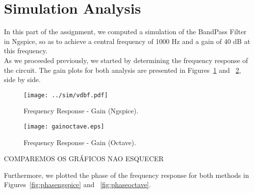 \section{Simulation Analysis}
\label{sec:simulation}

In this part of the assignment, we computed a simulation of the BandPass Filter in Ngspice, so as to achieve a central frequency of 1000 Hz and a gain of 40 dB at this frequency.\\

As we proceeded previously, we started by determining the frequency response of the circuit. The gain plots for both analysis are presented in Figures~\ref{fig:gainngspice} and ~\ref{fig:gainoctave}, side by side.

\vspace{-25mm}

\noindent
\begin{minipage}[c]{0.5\linewidth}

\begin{figure}[H] \centering
\texttt{[image: ../sim/vdbf.pdf]}
\caption{Frequency Response - Gain (Ngspice).}
\label{fig:gainngspice}
\end{figure}

\end{minipage}
\begin{minipage}[c]{0.5\linewidth}

\vspace{16mm}

\begin{figure}[H] \centering
\texttt{[image: gainoctave.eps]}
\caption{Frequency Response - Gain (Octave).}
\label{fig:gainoctave}
\end{figure}

\end{minipage}

COMPAREMOS OS GRÁFICOS NAO ESQUECER

\vspace{10mm}

Furthermore, we plotted the phase of the frequency response for both methods in Figures~\ref{fig:phasengspice} and ~\ref{fig:phaseoctave}.

\vspace{-25mm}


